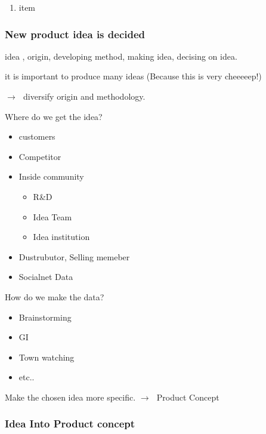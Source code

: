 \documentclass[12pt]{article}
\newcommand{\ra}{$\rightarrow \text{ }$}
\newcommand{\nii}{\noindent}
\begin{document}
\begin{enumerate}
	\item item

\end{enumerate}

\subsubsection{New product idea is decided}

idea , origin, developing method, making idea, decising on idea.

it is important to produce many ideas (Because this is very cheeeeep!)

\ra diversify origin and methodology.

Where do we get the idea?

\begin{itemize}
	\item customers
	\item Competitor
	\item Inside community \\
	\begin{itemize}
		\item R\&D
		\item Idea Team
		\item Idea institution
	\end{itemize}
	\item Dustrubutor, Selling memeber
	\item Socialnet Data
\end{itemize}
\nii
How do we make the data?
\begin{itemize}
	\item Brainstorming
	\item GI
	\item Town watching
	\item etc..
\end{itemize}

\begin{center}{
	\large Make the chosen idea more specific.
	\ra Product Concept
	}

\end{center}






\subsubsection{Idea Into Product concept}
\end{document}
